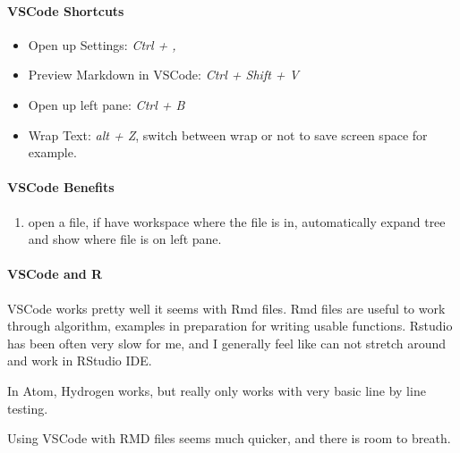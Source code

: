 \documentclass[]{article}
\providecommand{\tightlist}{%
  \setlength{\itemsep}{0pt}\setlength{\parskip}{0pt}}
\let\oldparagraph\paragraph
\renewcommand{\paragraph}[1]{\oldparagraph{#1}\mbox{}}
\begin{document}
\hypertarget{vscode-shortcuts}{%
\paragraph{VSCode Shortcuts}\label{vscode-shortcuts}}

\begin{itemize}
\tightlist
\item
  Open up Settings: \emph{Ctrl + ,}
\item
  Preview Markdown in VSCode: \emph{Ctrl + Shift + V}
\item
  Open up left pane: \emph{Ctrl + B}
\item
  Wrap Text: \emph{alt + Z}, switch between wrap or not to save screen
  space for example.
\end{itemize}

\hypertarget{vscode-benefits}{%
\paragraph{VSCode Benefits}\label{vscode-benefits}}

\begin{enumerate}
\def\labelenumi{\arabic{enumi}.}
\tightlist
\item
  open a file, if have workspace where the file is in, automatically
  expand tree and show where file is on left pane.
\end{enumerate}

\hypertarget{vscode-and-r}{%
\paragraph{VSCode and R}\label{vscode-and-r}}

VSCode works pretty well it seems with Rmd files. Rmd files are useful
to work through algorithm, examples in preparation for writing usable
functions. Rstudio has been often very slow for me, and I generally feel
like can not stretch around and work in RStudio IDE.

In Atom, Hydrogen works, but really only works with very basic line by
line testing.

Using VSCode with RMD files seems much quicker, and there is room to
breath.
\end{document}
